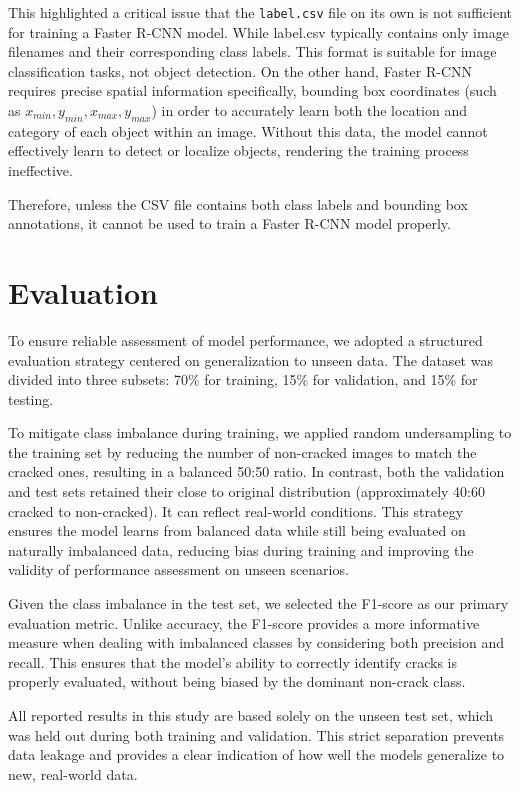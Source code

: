 This highlighted a critical issue that the \texttt{label.csv} file on its own is not sufficient for training a Faster R-CNN model. While label.csv typically contains only image filenames and their corresponding class labels. This format is suitable for image classification tasks, not object detection. On the other hand, Faster R-CNN requires precise spatial information specifically, bounding box coordinates (such as $x_{min}, y_{min}, x_{max}, y_{max}$) in order to accurately learn both the location and category of each object within an image. Without this data, the model cannot effectively learn to detect or localize objects, rendering the training process ineffective. 

Therefore, unless the CSV file contains both class labels and bounding box annotations, it cannot be used to train a Faster R-CNN model properly.

\section{Evaluation}

To ensure reliable assessment of model performance, we adopted a structured evaluation strategy centered on generalization to unseen data. The dataset was divided into three subsets: 70\% for training, 15\% for validation, and 15\% for testing.

To mitigate class imbalance during training, we applied random undersampling to the training set by reducing the number of non-cracked images to match the cracked ones, resulting in a balanced 50:50 ratio. In contrast, both the validation and test sets retained their close to original distribution (approximately 40:60 cracked to non-cracked). It can reflect real-world conditions. This strategy ensures the model learns from balanced data while still being evaluated on naturally imbalanced data, reducing bias during training and improving the validity of performance assessment on unseen scenarios.

Given the class imbalance in the test set, we selected the F1-score as our primary evaluation metric. Unlike accuracy, the F1-score provides a more informative measure when dealing with imbalanced classes by considering both precision and recall. This ensures that the model’s ability to correctly identify cracks is properly evaluated, without being biased by the dominant non-crack class.

All reported results in this study are based solely on the unseen test set, which was held out during both training and validation. This strict separation prevents data leakage and provides a clear indication of how well the models generalize to new, real-world data.

